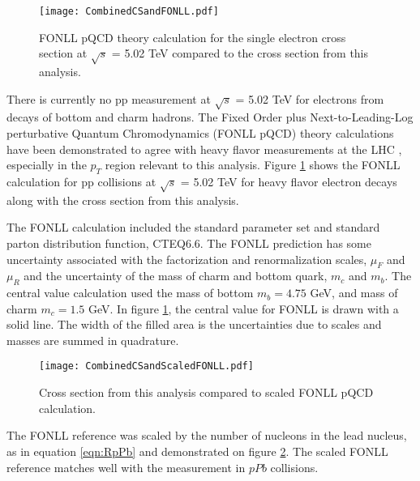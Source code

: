 
\begin{figure}[h!]
  \centering
  \texttt{[image: CombinedCSandFONLL.pdf]}\\
  \caption{FONLL pQCD theory calculation for the single electron cross section at $\sqrt{s}$ = 5.02 TeV compared to the cross section from this analysis.} \label{fig:CombinedCSandFONLL}
\end{figure}

There is currently no pp measurement at $\sqrt{s}$ = 5.02 TeV for electrons from decays of bottom and charm hadrons. The Fixed Order plus Next-to-Leading-Log perturbative Quantum Chromodynamics (FONLL pQCD) theory calculations have been demonstrated to agree with heavy flavor measurements at the LHC \cite{ALICE:2011aa} \cite{Abelev:2012xe}, especially in the $p_{T}$ region relevant to this analysis. Figure \ref{fig:CombinedCSandFONLL} shows the FONLL calculation \cite{Cacciari:1998it} for pp collisions at $\sqrt{s}$ = 5.02 TeV for heavy flavor electron decays along with the cross section from this analysis. 


The FONLL calculation \cite{Cacciari:1998it} included the standard parameter set and standard parton distribution function, CTEQ6.6. The FONLL prediction has some uncertainty associated with the factorization and renormalization scales, $\mu_{F}$ and $\mu_{R}$ and the uncertainty of the mass of charm and bottom quark, $m_{c}$ and $m_{b}$. The central value calculation used the mass of bottom $m_{b} = 4.75$ GeV, and mass of charm $m_{c} = 1.5$ GeV. In figure \ref{fig:CombinedCSandFONLL}, the central value for FONLL is drawn with a solid line. The width of the filled area is the uncertainties due to scales and masses are summed in quadrature.

\begin{figure}[h!]
  \centering
  \texttt{[image: CombinedCSandScaledFONLL.pdf]}\\
  \caption{Cross section from this analysis compared to scaled FONLL \cite{Cacciari:1998it} pQCD calculation.} \label{fig:CombinedCSandScaledFONLL}
\end{figure}

The FONLL reference was scaled by the number of nucleons in the lead nucleus, as in equation \ref{eqn:RpPb} and demonstrated on figure \ref{fig:CombinedCSandScaledFONLL}. The scaled FONLL reference matches well with the measurement in $pPb$ collisions.

